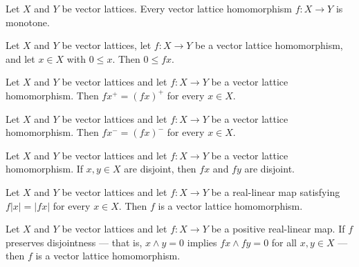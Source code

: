 \begin{lemma}
\label{lem:vecLatHom-monotone}
\leanok
{}
Let $X$ and $Y$ be vector lattices. Every vector lattice
homomorphism $f \colon X \to Y$ is monotone.
\end{lemma}

\begin{lemma}
\label{lem:vecLatHom-map-nonneg}
\leanok
{}
Let $X$ and $Y$ be vector lattices, let $f \colon X \to Y$ be a
vector lattice homomorphism, and let $x \in X$ with $0 \le x$.
Then $0 \le f x$.
\end{lemma}

\begin{lemma}
\label{lem:vecLatHom-map-posPart}
\leanok
{}
Let $X$ and $Y$ be vector lattices and let $f \colon X \to Y$ be a
vector lattice homomorphism. Then $f x^{+} = (f x)^{+}$ for every
$x \in X$.
\end{lemma}

\begin{lemma}
\label{lem:vecLatHom-map-negPart}
\leanok
{}
Let $X$ and $Y$ be vector lattices and let $f \colon X \to Y$ be a
vector lattice homomorphism. Then $f x^{-} = (f x)^{-}$ for every
$x \in X$.
\end{lemma}

\begin{lemma}
\label{lem:vecLatHom-map-disjoint}
\leanok
{}
Let $X$ and $Y$ be vector lattices and let $f \colon X \to Y$ be a
vector lattice homomorphism. If $x, y \in X$ are disjoint, then
$f x$ and $f y$ are disjoint.
\end{lemma}

\begin{theorem}
\label{thm:vecLatHom-of-abs}
\leanok
{}
Let $X$ and $Y$ be vector lattices and let $f \colon X \to Y$ be a
real-linear map satisfying $f \lvert x \rvert = \lvert f x \rvert$
for every $x \in X$. Then $f$ is a vector lattice homomorphism.
\end{theorem}

\begin{theorem}
\label{thm:vecLatHom-of-disjoint}
\leanok
{}
Let $X$ and $Y$ be vector lattices and let $f \colon X \to Y$ be a
positive real-linear map. If $f$ preserves disjointness — that
is, $x \wedge y = 0$ implies $f x \wedge f y = 0$ for all $x, y
\in X$ — then $f$ is a vector lattice homomorphism.
\end{theorem}

